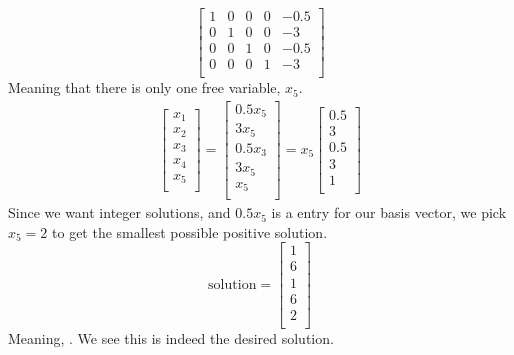 \documentclass{article}
\begin{document}
	\begin{equation*}
	\begin{bmatrix}
	1 &	0	&0&	0	&-0.5 \\ 
	0 &	1	&0&	0	&-3 \\
	0 &	0	&1&	0	&-0.5 \\
	0&	0	&0&	1	&-3 \\
	
	\end{bmatrix} 
	\end{equation*}
	Meaning that there is only one free variable, $x_5$.
	\begin{equation*}
	\begin{split}
	\begin{bmatrix}
	x_1 \\
	x_2 \\
	x_3 \\
	x_4 \\
	x_5 \\
	\end{bmatrix} = 
	\begin{bmatrix}
	0.5x_5 \\ 
	3x_5 \\
	0.5x_3 \\ 
	3x_5 \\
	x_5 \\
	\end{bmatrix} = 
	x_5
	\begin{bmatrix}
	0.5 \\ 
	3 \\
	0.5 \\ 
	3 \\
	1\\
	\end{bmatrix}
	\end{split}
	\end{equation*}
	Since we want integer solutions, and $0.5x_5$ is a entry for our basis vector, we pick $x_5 = 2$ to get the smallest possible positive solution. 
	$$ \mathrm{solution} = 
	\begin{bmatrix}
	1 \\
	6 \\
	1 \\
	6 \\
	2 \\
	\end{bmatrix}
	$$
	Meaning, . We see this is indeed the desired solution.
	
\end{document}
